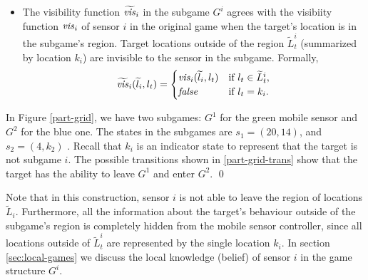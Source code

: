 \begin{itemize}
  \item The visibility function $\widetilde{\mathit{vis}}_i$ in the subgame $G^i$ agrees with the visibiity function $\mathit{vis}_i$ of sensor $i$ in the original game when the target's location is in the subgame's region. Target locations outside of the region $\widetilde L_t^i$  (summarized by location $k_i$) are invisible to the sensor in the subgame. Formally, 
 \[\widetilde{\mathit{vis}}_i(\widetilde{l}_i,l_t) = \begin{cases}
\mathit{vis}_i(\widetilde{l}_i,l_t) & \text{if } l_t \in \widetilde{L}_t^i, \\
\mathit{false} & \text{if } l_t  = k_i.
\end{cases}
\]
\end{itemize}
\begin{example}
In Figure \ref{part-grid}, we have two subgames: $G^1$ for the green mobile sensor and $G^2$ for the blue one. The states in the subgames are $s_1 = (20,14)$, and $s_2 = (4,k_2)$ . Recall that $k_i$ is an indicator state to represent that the target is not subgame $i$. The possible transitions shown in \ref{part-grid-trans} show that the target has the ability to leave $G^1$ and enter $G^2$. 
\qed
\end{example}

Note that in this construction, sensor $i$ is not able to leave the region of locations $\widetilde{L}_i$. Furthermore, all the information about the target's behaviour outside of  the subgame's region is completely hidden from the mobile sensor controller, since all locations outside of  $\widetilde{L}_t^i$ are represented by the single location $k_i$.
In section \ref{sec:local-games} we discuss the local knowledge (belief)  of sensor $i$ in the game structure $G^i$.
 
